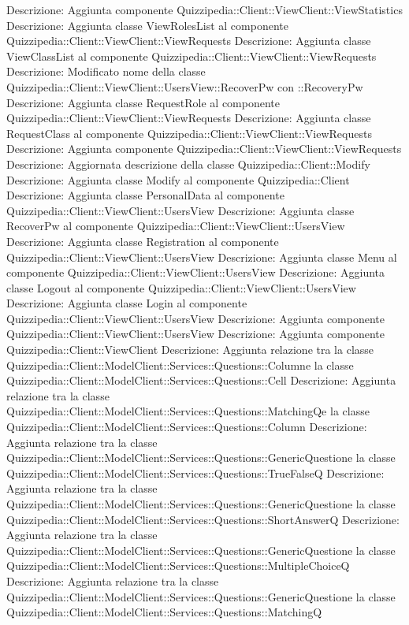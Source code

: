 Descrizione: Aggiunta componente Quizzipedia::Client::ViewClient::ViewStatistics 
Descrizione: Aggiunta classe ViewRolesList al componente Quizzipedia::Client::ViewClient::ViewRequests 
Descrizione: Aggiunta classe ViewClassList al componente Quizzipedia::Client::ViewClient::ViewRequests 
Descrizione: Modificato nome della classe Quizzipedia::Client::ViewClient::UsersView::RecoverPw con ::RecoveryPw 
Descrizione: Aggiunta classe RequestRole al componente Quizzipedia::Client::ViewClient::ViewRequests 
Descrizione: Aggiunta classe RequestClass al componente Quizzipedia::Client::ViewClient::ViewRequests 
Descrizione: Aggiunta componente Quizzipedia::Client::ViewClient::ViewRequests 
Descrizione: Aggiornata descrizione della classe Quizzipedia::Client::Modify 
Descrizione: Aggiunta classe Modify al componente Quizzipedia::Client 
Descrizione: Aggiunta classe PersonalData al componente Quizzipedia::Client::ViewClient::UsersView 
Descrizione: Aggiunta classe RecoverPw al componente Quizzipedia::Client::ViewClient::UsersView 
Descrizione: Aggiunta classe Registration al componente Quizzipedia::Client::ViewClient::UsersView 
Descrizione: Aggiunta classe Menu al componente Quizzipedia::Client::ViewClient::UsersView 
Descrizione: Aggiunta classe Logout al componente Quizzipedia::Client::ViewClient::UsersView 
Descrizione: Aggiunta classe Login al componente Quizzipedia::Client::ViewClient::UsersView 
Descrizione: Aggiunta componente Quizzipedia::Client::ViewClient::UsersView 
Descrizione: Aggiunta componente Quizzipedia::Client::ViewClient 
Descrizione: Aggiunta relazione tra la classe Quizzipedia::Client::ModelClient::Services::Questions::Columne la classe Quizzipedia::Client::ModelClient::Services::Questions::Cell 
Descrizione: Aggiunta relazione tra la classe Quizzipedia::Client::ModelClient::Services::Questions::MatchingQe la classe Quizzipedia::Client::ModelClient::Services::Questions::Column 
Descrizione: Aggiunta relazione tra la classe Quizzipedia::Client::ModelClient::Services::Questions::GenericQuestione la classe Quizzipedia::Client::ModelClient::Services::Questions::TrueFalseQ 
Descrizione: Aggiunta relazione tra la classe Quizzipedia::Client::ModelClient::Services::Questions::GenericQuestione la classe Quizzipedia::Client::ModelClient::Services::Questions::ShortAnswerQ 
Descrizione: Aggiunta relazione tra la classe Quizzipedia::Client::ModelClient::Services::Questions::GenericQuestione la classe Quizzipedia::Client::ModelClient::Services::Questions::MultipleChoiceQ 
Descrizione: Aggiunta relazione tra la classe Quizzipedia::Client::ModelClient::Services::Questions::GenericQuestione la classe Quizzipedia::Client::ModelClient::Services::Questions::MatchingQ 
